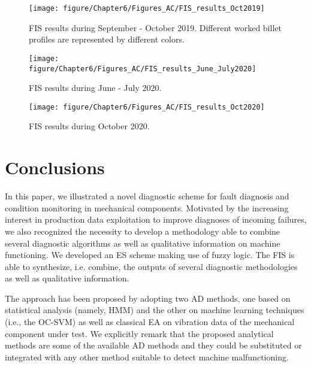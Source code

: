 \begin{figure}[!ht]
    \centering
    \texttt{[image: figure/Chapter6/Figures\_AC/FIS\_results\_Oct2019]}
    \caption{FIS results during September - October 2019. Different worked billet profiles are represented by different colors.}
    \label{fig:FIS_results_oct2019}
\end{figure}

\begin{figure}[!ht]
    \centering
    \texttt{[image: figure/Chapter6/Figures\_AC/FIS\_results\_June\_July2020]}
    \caption{FIS results during June - July 2020.}
    \label{fig:FIS_results_june2020}
\end{figure}

\begin{figure}[!ht]
    \centering
    \texttt{[image: figure/Chapter6/Figures\_AC/FIS\_results\_Oct2020]}
    \caption{FIS results during October 2020.}
    \label{fig:FIS_results_oct2020}
\end{figure} 

 
\section{Conclusions} \label{sec:conclusions}

In this paper, we illustrated a  novel diagnostic scheme for fault diagnosis and condition monitoring in mechanical components.  Motivated by the increasing interest in production data exploitation to improve diagnoses of incoming failures, we also recognized the necessity to develop a methodology able to combine several diagnostic algorithms as well as qualitative information on machine functioning. We developed an ES scheme making use of fuzzy logic. The FIS is able to synthesize, i.e. combine, the outputs of several diagnostic methodologies as well as qualitative information. 

The approach has been proposed by adopting two AD methods, one based on statistical analysis (namely, HMM) and the other on machine learning techniques (i.e., the OC-SVM) as well as classical EA on vibration data of the mechanical component under test.  We explicitly remark that the proposed analytical methods are some of the available AD methods and they could be substituted or integrated with any other method suitable to detect machine malfunctioning. 


